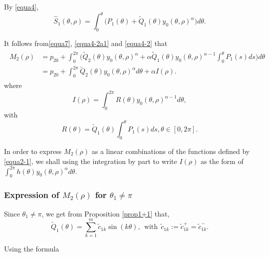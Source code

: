 \documentclass[11pt]{amsart}
\theoremstyle{remark}
\theoremstyle{definition}
\begin{document}
By \eqref{equa4},
\begin{equation} \label{equa4-2}\hat{S}_1(\theta,\rho)= \int_{0}^{\theta} \big(P_1(\theta)+ \tilde{Q}_1(\theta)y_0(\theta,\rho)^{\alpha}\big)d \theta. \end{equation}

It follows from\eqref{equa7}, \eqref{equa4-2a1} and \eqref{equa4-2}   that
\begin{align} \label{equa7-2}
\begin{split}
M_{2}(\rho)&=p_{20}+\int_{0}^{2\pi} \bigg( \tilde{Q}_2(\theta)y_0(\theta,\rho)^{\alpha}+\alpha\tilde{Q}_1(\theta)y_0(\theta,\rho)^{\alpha-1} \int_{0}^{\theta}P_1(s)ds\bigg)d \theta\\
&=p_{20}+ \int_{0}^{2\pi}\tilde{Q}_2(\theta)y_0(\theta,\rho)^{\alpha}d \theta+\alpha I(\rho).
\end{split}
\end{align}
where \begin{equation}\label{equadefI} I(\rho)=\int_{0}^{2\pi}R(\theta)y_0(\theta,\rho)^{\alpha-1} d\theta,\end{equation}  with
\begin{equation}\label{equadefR}R(\theta)=\tilde{Q}_1(\theta)\int_{0}^{\theta}P_1(s)ds, \theta \in [0,2\pi].\end{equation}


In order to express  $M_{2}(\rho)$  as a linear combinations of the functions defined by \eqref{equa2-1},  we shall using the integration by part to  write $ I(\rho)$  as the form of $ \int_{0}^{2\pi} h(\theta)y_0(\theta,\rho)^{\alpha}d \theta$.




\subsubsection{Expression of $M_{2}(\rho)$ for $\theta_1\neq \pi$}

\hspace{0.3cm}

 Since $\theta_1\neq \pi$, we get from Proposition \ref{prop1+1} that,
 $$\tilde{Q}_1(\theta)=\sum_{k=1}^{m}\tilde{c}_{1k}\sin (k\theta), \ \ \mbox{with}\ \ \tilde{c}_{1k}:=\tilde{c}_{1k}^+=\tilde{c}_{1k}^-.$$

 Using  the  formula
\end{document}
